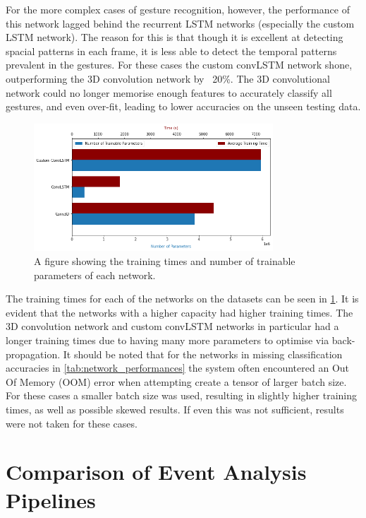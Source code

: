 For the more complex cases of gesture recognition, however, the performance of this network lagged behind the recurrent LSTM networks (especially the custom LSTM network). The reason for this is that though it is excellent at detecting spacial patterns in each frame, it is less able to detect the temporal patterns prevalent in the gestures. For these cases the custom convLSTM network shone, outperforming the 3D convolution network by ~20\%. The 3D convolutional network could no longer memorise enough features to accurately classify all gestures, and even over-fit, leading to lower accuracies on the unseen testing data.

\begin{figure}[htb]
    \centering
    \includegraphics[width=0.8\textwidth]{testingandresults/images/training_time_and_trainable_parameters.png}
    \caption{A figure showing the training times and number of trainable parameters of each network.}
    \label{fig:training_times_and_trainable_parameters}
\end{figure}

The training times for each of the networks on the datasets can be seen in \cref{fig:training_times_and_trainable_parameters}. It is evident that the networks with a higher capacity had higher training times. The 3D convolution network and custom convLSTM networks in particular had a longer training times due to having many more parameters to optimise via back-propagation. It should be noted that for the networks in missing classification accuracies in \cref{tab:network_performances} the system often encountered an Out Of Memory (OOM) error when attempting create a tensor of larger batch size. For these cases a smaller batch size was used, resulting in slightly higher training times, as well as possible skewed results. If even this was not sufficient, results were not taken for these cases.

\section{Comparison of Event Analysis Pipelines}

